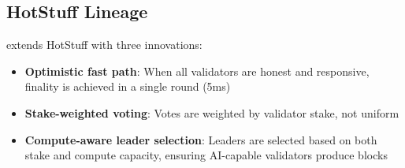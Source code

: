 \subsection{HotStuff Lineage}

\Quasar{} extends HotStuff with three innovations:

\begin{itemize}
    \item \textbf{Optimistic fast path}: When all validators are honest and responsive, finality is achieved in a single round (5ms)
    \item \textbf{Stake-weighted voting}: Votes are weighted by validator stake, not uniform
    \item \textbf{Compute-aware leader selection}: Leaders are selected based on both stake and compute capacity, ensuring AI-capable validators produce blocks
\end{itemize}

